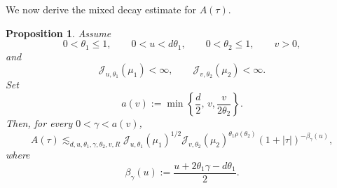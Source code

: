 \documentclass[11pt]{amsart}
\numberwithin{equation}{section}
\renewcommand{\le}{\leqslant}
\newcommand{\J}{\mathcal{J}}
\newtheorem{proposition}[theorem]{Proposition}
\theoremstyle{plain}
\theoremstyle{remark}
\begin{document}
We now derive the mixed decay estimate for $A(\tau)$.

\begin{proposition}\label{prop:A-decay-theta1-theta2}
Assume
\[
0<\theta_1\le 1,
\qquad
0<u<d\theta_1,
\qquad
0<\theta_2\le 1,
\qquad
v>0,
\]
and
\[
\J_{u,\theta_1}(\mu_1)<\infty,
\qquad
\J_{v,\theta_2}(\mu_2)<\infty.
\]
Set
\[
a(v):=\min\!\left\{\frac d2,\, v, \frac{v}{2\theta_2}\right\}.
\]
Then, for every $0<\gamma<a(v)$,
\begin{equation}\label{eq:A-decay-theta1-theta2}
A(\tau)
\lesssim_{d,u,\theta_1,\gamma,\theta_2,v,R}
\J_{u,\theta_1}(\mu_1)^{1/2}
\J_{v,\theta_2}(\mu_2)^{\theta_1\rho(\theta_2)}
(1+|\tau|)^{-\beta_\gamma(u)},
\end{equation}
where
\[
\beta_\gamma(u):=\frac{u+2\theta_1\gamma-d\theta_1}{2}.
\]
\end{proposition}
\end{document}
